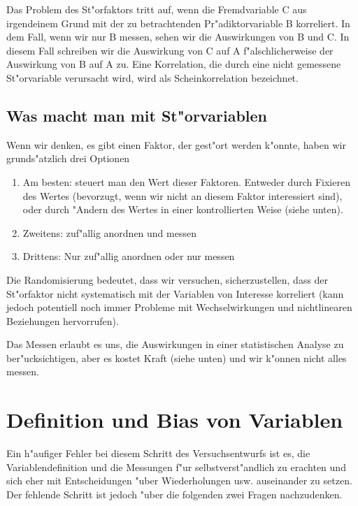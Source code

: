 \documentclass[a4paper,twoside]{tufte-book}\usepackage[]{graphicx}\usepackage[]{color}
\begin{document}
Das Problem des St"orfaktors tritt auf, wenn die Fremdvariable C aus irgendeinem Grund mit der zu betrachtenden Pr"adiktorvariable B korreliert. In dem Fall, wenn wir nur B messen, sehen wir die Auswirkungen von B und C. In diesem Fall schreiben wir die Auswirkung von C auf A f"alschlicherweise der Auswirkung von B auf A zu.  Eine Korrelation, die durch eine nicht gemessene St"orvariable verursacht wird, wird als Scheinkorrelation bezeichnet.

\subsection{Was macht man mit St"orvariablen}

Wenn wir denken, es gibt einen Faktor, der gest"ort werden k"onnte, haben wir grunds"atzlich drei Optionen

\begin{enumerate}
\item Am besten: steuert man den Wert dieser Faktoren. Entweder durch Fixieren des Wertes (bevorzugt, wenn wir nicht an diesem Faktor interessiert sind), oder durch "Andern des Wertes in einer kontrollierten Weise (siehe unten).
\item Zweitens: zuf"allig anordnen und messen
\item Drittens: Nur zuf"allig anordnen oder nur messen
\end{enumerate}

Die Randomisierung bedeutet, dass wir versuchen, sicherzustellen, dass der St"orfaktor nicht systematisch mit der Variablen von Interesse korreliert (kann jedoch potentiell noch immer Probleme mit Wechselwirkungen und nichtlinearen Beziehungen hervorrufen).


Das Messen erlaubt es uns, die Auswirkungen in einer statistischen Analyse zu ber"ucksichtigen, aber es kostet Kraft (siehe unten) und wir k"onnen nicht alles messen.
\section{Definition und Bias von Variablen}

Ein h"aufiger Fehler bei diesem Schritt des Versuchsentwurfs ist es, die Variablendefinition und die Messungen f"ur selbstverst"andlich zu erachten und sich eher mit Entscheidungen "uber Wiederholungen usw. auseinander zu setzen. Der fehlende Schritt ist jedoch "uber die folgenden zwei Fragen nachzudenken. 
\end{document}
